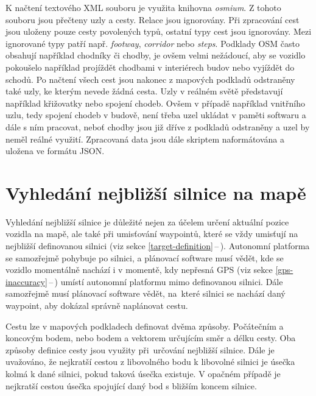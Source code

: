 \documentclass[czech, bachelor]{diploma}
\newcommand{\filipref}[1]{\ref{#1}\,--\,\nameref{#1}}
\begin{document}
K načtení textového XML souboru je využita knihovna \emph{osmium}. Z tohoto souboru jsou přečteny uzly a cesty. Relace jsou
ignorovány. Při zpracování cest jsou uloženy pouze cesty povolených typů, ostatní typy cest jsou ignorovány. Mezi ignorované typy
patří např. \emph{footway}, \emph{corridor} nebo \emph{steps}. Podklady OSM často obsahují například chodníky či chodby, je ovšem
velmi nežádoucí, aby se vozidlo pokoušelo například projíždět chodbami v interiérech budov nebo vyjíždět do schodů. Po načtení
všech cest jsou nakonec z mapových podkladů odstraněny také uzly, ke kterým nevede žádná cesta. Uzly v reálném světě představují
například křižovatky nebo spojení chodeb. Ovšem v případě například vnitřního uzlu, tedy spojení chodeb v budově, není třeba uzel
ukládat v paměti softwaru a dále s ním pracovat, neboť chodby jsou již dříve z podkladů odstraněny a uzel by neměl reálné využití.
Zpracovaná data jsou dále skriptem naformátována a uložena ve formátu JSON.

\section{Vyhledání nejbližší silnice na mapě}

Vyhledání nejbližší silnice je důležité nejen za účelem určení aktuální pozice vozidla na mapě, ale také při umisťování waypointů,
které se vždy umisťují na nejbližší definovanou silnici (viz sekce \filipref{target-definition}). Autonomní platforma
se samozřejmě pohybuje po silnici, a plánovací software musí vědět, kde se vozidlo momentálně nachází i v momentě, kdy nepřesná
GPS (viz sekce \filipref{gps-inaccuracy}) umístí autonomní platformu mimo definovanou silnici. Dále samozřejmě musí plánovací
software vědět, na~které silnici se nachází daný waypoint, aby dokázal správně naplánovat cestu.

Cestu lze v mapových podkladech definovat dvěma způsoby. Počátečním a koncovým bodem, nebo bodem a vektorem určujícím směr a délku
cesty. Oba způsoby definice cesty jsou využity při~určování nejbližší silnice. Dále je uvažováno, že nejkratší cestou
z libovolného bodu k libovolné silnici je úsečka kolmá k dané silnici, pokud taková úsečka existuje. V opačném případě
je nejkratší cestou úsečka spojující daný bod s bližším koncem silnice.
\end{document}

